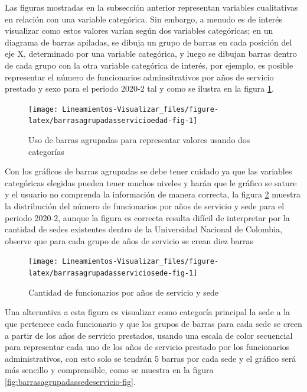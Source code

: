 \documentclass[
]{book}
\begin{document}
Las figuras mostradas en la subsección anterior representan variables cualitativas en relación con una variable categórica. Sin embargo, a menudo es de interés visualizar como estos valores varían según dos variables categóricas; en un diagrama de barras apiladas, se dibuja un grupo de barras en cada posición del eje X, determinado por una variable categórica, y luego se dibujan barras dentro de cada grupo con la otra variable categórica de interés, por ejemplo, es posible representar el número de funcionarios adminsitrativos por años de servicio prestado y sexo para el periodo 2020-2 tal y como se ilustra en la figura \ref{fig:barrasagrupadasservicioedad-fig}.

\begin{figure}

{\centering \texttt{[image: Lineamientos-Visualizar\_files/figure-latex/barrasagrupadasservicioedad-fig-1]} 

}

\caption{Uso de barras agrupadas para representar valores usando dos categorías}\label{fig:barrasagrupadasservicioedad-fig}
\end{figure}

Con los gráficos de barras agrupadas se debe tener cuidado ya que las variables categóricas elegidas pueden tener muchos niveles y harán que le gráfico se sature y el usuario no comprenda la información de manera correcta, la figura \ref{fig:barrasagrupadasserviciosede-fig} muestra la distribución del número de funcionarios por años de servicio y sede para el periodo 2020-2, aunque la figura es correcta resulta difícil de interpretar por la cantidad de sedes existentes dentro de la Universidad Nacional de Colombia, observe que para cada grupo de años de servicio se crean diez barras

\begin{figure}

{\centering \texttt{[image: Lineamientos-Visualizar\_files/figure-latex/barrasagrupadasserviciosede-fig-1]} 

}

\caption{Cantidad de funcionarios por años de servicio y sede}\label{fig:barrasagrupadasserviciosede-fig}
\end{figure}

Una alternativa a esta figura es visualizar como categoría principal la sede a la que pertenece cada funcionario y que los grupos de barras para cada sede se creen a partir de los años de servicio prestados, usando una escala de color secuencial para representar cada uno de los años de servicio prestado por los funcionarios administrativos, con esto solo se tendrán 5 barras por cada sede y el gráfico será más sencillo y comprensible, como se muestra en la figura \ref{fig:barrasagrupadassedeservicio-fig}.
\end{document}
